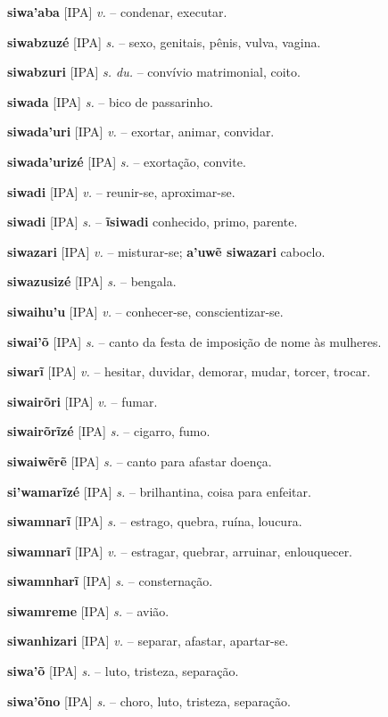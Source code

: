 \textbf{siwa'aba} [IPA] \textit{v.} -- condenar, executar.

\textbf{siwabzuzé} [IPA] \textit{s.} -- sexo, genitais, pênis, vulva, vagina.

\textbf{siwabzuri} [IPA] \textit{s. du.} -- convívio matrimonial, coito.

\textbf{siwada} [IPA] \textit{s.} -- bico de passarinho.

\textbf{siwada'uri} [IPA] \textit{v.} -- exortar, animar, convidar.

\textbf{siwada'urizé} [IPA] \textit{s.} -- exortação, convite.

\textbf{siwadi} [IPA] \textit{v.} -- reunir-se, aproximar-se.

\textbf{siwadi} [IPA] \textit{s.} -- \textbf{ĩsiwadi} conhecido, primo, parente.

\textbf{siwazari} [IPA] \textit{v.} -- misturar-se; \textbf{a'uwẽ siwazari} caboclo.

\textbf{siwazusizé} [IPA] \textit{s.} -- bengala.

\textbf{siwaihu'u} [IPA] \textit{v.} -- conhecer-se, conscientizar-se.

\textbf{siwai'õ} [IPA] \textit{s.} -- canto da festa de imposição de nome às mulheres.

\textbf{siwarĩ} [IPA] \textit{v.} -- hesitar, duvidar, demorar, mudar, torcer, trocar.

\textbf{siwairõri} [IPA] \textit{v.} -- fumar.

\textbf{siwairõrĩzé} [IPA] \textit{s.} -- cigarro, fumo.

\textbf{siwaiwẽrẽ} [IPA] \textit{s.} -- canto para afastar doença.

\textbf{si'wamarĩzé} [IPA] \textit{s.} -- brilhantina, coisa para enfeitar.

\textbf{siwamnarĩ} [IPA] \textit{s.} -- estrago, quebra, ruína, loucura.

\textbf{siwamnarĩ} [IPA] \textit{v.} -- estragar, quebrar, arruinar, enlouquecer.

\textbf{siwamnharĩ} [IPA] \textit{s.} -- consternação.

\textbf{siwamreme} [IPA] \textit{s.} -- avião.

\textbf{siwanhizari} [IPA] \textit{v.} -- separar, afastar, apartar-se.

\textbf{siwa'õ} [IPA] \textit{s.} -- luto, tristeza, separação.

\textbf{siwa'õno} [IPA] \textit{s.} -- choro, luto, tristeza, separação.

